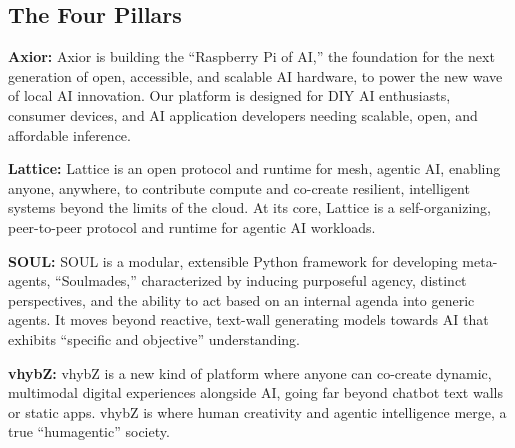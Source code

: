 \documentclass[12pt]{article}
\begin{document}
\begin{multicols}{2}

\section{\color{axiorMagenta} The Four Pillars}

\textbf{Axior:} Axior is building the “Raspberry Pi of AI,” the foundation for the next generation of open, accessible, and scalable AI hardware, to power the new wave of local AI innovation. Our platform is designed for DIY AI enthusiasts, consumer devices, and AI application developers needing scalable, open, and affordable inference.

\vspace{0.7em}

\textbf{Lattice:} Lattice is an open protocol and runtime for mesh, agentic AI, enabling anyone, anywhere, to contribute compute and co-create resilient, intelligent systems beyond the limits of the cloud. At its core, Lattice is a self-organizing, peer-to-peer protocol and runtime for agentic AI workloads.

\vspace{0.7em}

\textbf{SOUL:} SOUL is a modular, extensible Python framework for developing meta-agents, “Soulmades,” characterized by inducing purposeful agency, distinct perspectives, and the ability to act based on an internal agenda into generic agents. It moves beyond reactive, text-wall generating models towards AI that exhibits “specific and objective” understanding.

\vspace{0.7em}

\textbf{vhybZ:} vhybZ is a new kind of platform where anyone can co-create dynamic, multimodal digital experiences alongside AI, going far beyond chatbot text walls or static apps. vhybZ is where human creativity and agentic intelligence merge, a true “humagentic” society.

\vspace{1em}


\end{multicols}
\end{document}
